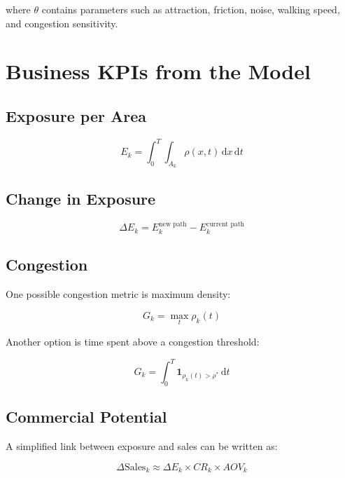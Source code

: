\documentclass[11pt,a4paper]{article}
\begin{document}
where $\theta$ contains parameters such as attraction, friction, noise, walking speed, and congestion sensitivity.

\section{Business KPIs from the Model}

\subsection{Exposure per Area}

\begin{equation}
E_k = \int_0^T \int_{A_k} \rho(x,t)\,\mathrm{d}x\,\mathrm{d}t
\end{equation}

\subsection{Change in Exposure}

\begin{equation}
\Delta E_k = E_k^{\text{new path}} - E_k^{\text{current path}}
\end{equation}

\subsection{Congestion}

One possible congestion metric is maximum density:

\begin{equation}
G_k = \max_t \rho_k(t)
\end{equation}

Another option is time spent above a congestion threshold:

\begin{equation}
G_k = \int_0^T \mathbf{1}_{\rho_k(t)>\rho^*}\,\mathrm{d}t
\end{equation}

\subsection{Commercial Potential}

A simplified link between exposure and sales can be written as:

\begin{equation}
\Delta \text{Sales}_k \approx \Delta E_k \times CR_k \times AOV_k
\end{equation}
\end{document}
